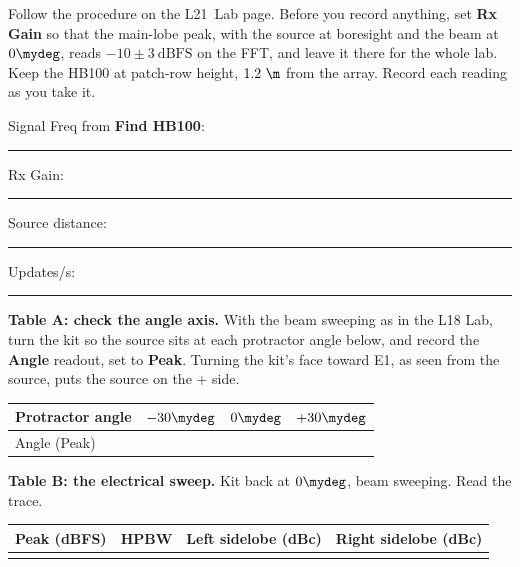 \documentclass{exam}
\newif\ifkey
\def\labLesson{21}
\newcommand{\kv}[1]{\ifkey{\color{red}#1}\fi\rule[-0.10in]{0pt}{0.34in}}
\begin{document}
\begin{questions}
\begin{parts}
\end{parts}

\vspace{12pt}

Follow the procedure on the L\labLesson\ Lab page. Before you record anything,
set \textbf{Rx Gain} so that the main-lobe peak, with the source at boresight
and the beam at $0\mydeg$, reads $-10 \pm 3\ \text{dBFS}$ on the FFT, and leave
it there for the whole lab. Keep the HB100 at patch-row height, $1.2\ \m$ from
the array. Record each reading as you take it.

Signal Freq from \textbf{Find HB100}: \rule[-2pt]{1.1in}{0.4pt} \hfill
Rx Gain: \rule[-2pt]{0.6in}{0.4pt} \hfill
Source distance: \rule[-2pt]{0.6in}{0.4pt} \hfill
Updates/s: \rule[-2pt]{0.5in}{0.4pt}

\question \textbf{Table A: check the angle axis.} With the beam sweeping as in
the L18 Lab, turn the kit so the source sits at each protractor angle below,
and record the \textbf{Angle} readout, set to \textbf{Peak}. Turning the kit's face toward E1, as seen from
the source, puts the source on the $+$ side.

\begin{center}
\renewcommand{\arraystretch}{1.25}
\begin{tabular}{| l | K{1.0in} | K{1.0in} | K{1.0in} |}
\hline
Protractor angle & $-30\mydeg$ & $0\mydeg$ & $+30\mydeg$ \\\hline
Angle (Peak) & \kv{$-30 \pm 2\mydeg$} & \kv{$0 \pm 2\mydeg$} & \kv{$+30 \pm 2\mydeg$} \\\hline
\end{tabular}
\end{center}

\question \textbf{Table B: the electrical sweep.} Kit back at $0\mydeg$, beam
sweeping. Read the trace.

\begin{center}
\renewcommand{\arraystretch}{1.25}
\begin{tabular}{| K{1.1in} | K{1.0in} | K{1.2in} | K{1.2in} |}
\hline
\textbf{Peak (dBFS)} & \textbf{HPBW} & \textbf{Left sidelobe (dBc)} & \textbf{Right sidelobe (dBc)} \\\hline
\kv{$-10 \pm 3$} & \kv{$13.0 \pm 1\mydeg$} & \kv{$-11$ to $-13$} & \kv{$-11$ to $-13$} \\\hline
\end{tabular}
\end{center}


\end{questions}
\end{document}
